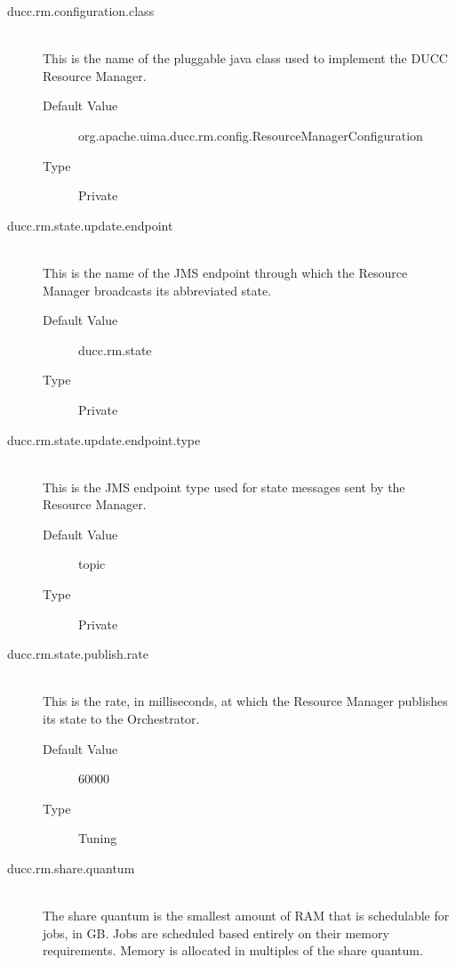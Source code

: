     \begin{description}
        \item[ducc.rm.configuration.class] \hfill \\
          This is the name of the pluggable java class used to implement the DUCC Resource 
          Manager. 
          \begin{description}
            \item[Default Value] org.apache.uima.ducc.rm.config.ResourceManagerConfiguration 
            \item[Type] Private 
          \end{description}
          
        \item[ducc.rm.state.update.endpoint] \hfill \\
          This is the name of the JMS endpoint through which the Resource Manager broadcasts its 
          abbreviated state. 
          \begin{description}
            \item[Default Value] ducc.rm.state              
            \item[Type] Private
          \end{description} 

        \item[ducc.rm.state.update.endpoint.type] \hfill \\
          This is the JMS endpoint type used for state messages sent by the Resource Manager.
          \begin{description}            
            \item[Default Value] topic 
            \item[Type] Private 
          \end{description}
          
        \item[ducc.rm.state.publish.rate] \hfill \\
          This is the rate, in milliseconds, at which the Resource Manager publishes its state to the 
          Orchestrator. 
          \begin{description}
            \item[Default Value] 60000 
            \item[Type] Tuning
          \end{description} 
          
        \item[ducc.rm.share.quantum] \hfill \\
          The share quantum is the smallest amount of RAM that is schedulable for jobs, in GB. 
          Jobs are scheduled based entirely on their memory requirements. Memory is allocated in 
          multiples of the share quantum. 


\end{description}
